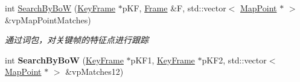 \begin{DoxyCompactItemize}
\item 
int \hyperlink{classORB__SLAM2_1_1ORBmatcher_ab38a8d3f3803e398c173ef45b25e66d8}{Search\-By\-Bo\-W} (\hyperlink{classORB__SLAM2_1_1KeyFrame}{Key\-Frame} $\ast$p\-K\-F, \hyperlink{classORB__SLAM2_1_1Frame}{Frame} \&F, std\-::vector$<$ \hyperlink{classORB__SLAM2_1_1MapPoint}{Map\-Point} $\ast$ $>$ \&vp\-Map\-Point\-Matches)
\begin{DoxyCompactList}\small\item\em 通过词包，对关键帧的特征点进行跟踪 \end{DoxyCompactList}\item 
\hypertarget{classORB__SLAM2_1_1ORBmatcher_a7508b39750df8f6f70dab0d2252b9d42}{int {\bfseries Search\-By\-Bo\-W} (\hyperlink{classORB__SLAM2_1_1KeyFrame}{Key\-Frame} $\ast$p\-K\-F1, \hyperlink{classORB__SLAM2_1_1KeyFrame}{Key\-Frame} $\ast$p\-K\-F2, std\-::vector$<$ \hyperlink{classORB__SLAM2_1_1MapPoint}{Map\-Point} $\ast$ $>$ \&vp\-Matches12)}\label{classORB__SLAM2_1_1ORBmatcher_a7508b39750df8f6f70dab0d2252b9d42}


\end{DoxyCompactItemize}
